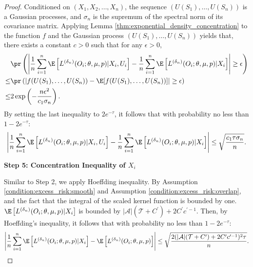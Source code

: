 \begin{proof}
Conditioned on $(X_1,X_2,\ldots,X_n)$, the sequence $( U(S_1),\ldots, U(S_n))$ is a Gaussian processes, and $\sigma_n$ is the supremum of the spectral norm of its covariance matrix. Applying Lemma \ref{thm:exponential_density_concentration} to the function $f$ and the Gaussian process $( U(S_1),\ldots, U(S_n))$ yields that, there exists a constant $c>0$ such that for any $\epsilon>0$,
\begin{align*}
&\pr\left(\left|\frac{1}{n}\sum_{i=1}^n\E\left[L^{({\delta_n})}(O_i;\theta,\mu, p)|X_i,U_i\right]-\frac{1}{n}\sum_{i=1}^n\E\left[L^{({\delta_n})}(O_i;\theta,\mu, p)|X_i\right]\right|\geq \epsilon\right)\\
    \leq & \pr\left(\left|f( U(S_1),\ldots,U(S_n))-\E[f( U(S_1),\ldots,U(S_n))]\right|\geq \epsilon\right)\\
    \leq & 2 \exp\left(-\frac{n\epsilon^2}{c_1\sigma_n}\right).
\end{align*}
By setting the last inequality to $2e^{-\tau}$, it follows that with probability no less than $1-2e^{-\tau}$:
$$\left|\frac{1}{n}\sum_{i=1}^n\E\left[L^{({\delta_n})}(O_i;\theta,\mu, p)|X_i,U_i\right]-\frac{1}{n}\sum_{i=1}^n\E\left[L^{({\delta_n})}(O_i;\theta,\mu, p)|X_i\right]\right|\leq \sqrt{\frac{c_1\tau\sigma_n}{n}}.$$

\noindent \textbf{Step 5: Concentration Inequality of $ X_i$}


\noindent Similar to Step 2, we apply Hoeffding inequality. By Assumption \ref{condition:excess_risk:smooth} and Assumption \ref{condition:excess_risk:overlap}, and the fact that the integral of the scaled kernel function is bounded by one. $\E\left[L^{({\delta_n})}(O_i;\theta,\mu, p)|X_i\right]$ is bounded by $|\mathcal{A}|(\mathcal{T}+C^\prime) + 2C^\prime c^{\prime-1}$. Then, by Hoeffding's inequality, it follows that with probability no less than $1-2e^{-\tau}$:
$$\left|\frac{1}{n}\sum_{i=1}^n\E\left[L^{({\delta_n})}(O_i;\theta,\mu, p)|X_i\right]-\E\left[L^{({\delta_n})}(O_i;\theta,\mu, p)\right]\right|\leq \sqrt{\frac{2(|\mathcal{A}|(\mathcal{T}+C^\prime) + 2C^\prime c^{\prime-1})^2\tau}{n}}.$$


\end{proof}
